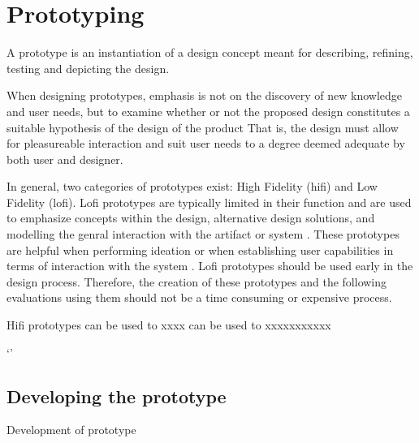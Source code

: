 \section{Prototyping} %
A prototype is an instantiation of a design concept meant for describing, refining, testing and depicting the design. \cite{BUXTON2007139_prototyping}

When designing prototypes, emphasis is not on the discovery of new knowledge and user needs, but to examine whether or not the proposed design constitutes a suitable hypothesis of the design of the product \cite{nielsen-norman-prototype-low-vs-high,BUXTON2007139_prototyping}
That is, the design must allow for pleasureable interaction and suit user needs to a degree deemed adequate by both user and designer.

In general, two categories of prototypes exist: High Fidelity (hifi) and Low Fidelity (lofi).
Lofi prototypes are typically limited in their function and are used to emphasize concepts within the design, alternative design solutions, and modelling the genral interaction with the artifact or system \cite{low-vs-high-fidelity-prototype}.
These prototypes are helpful when performing ideation %
or when establishing user capabilities in terms of interaction with the system \cite{usefullness-of-different-prototypes,low-vs-high-fidelity-prototype}. 
Lofi prototypes should be used early in the design process. 
Therefore, the creation of these prototypes and the following evaluations  using them should not be a time consuming or expensive process. \cite{usefullness-of-different-prototypes,low-vs-high-fidelity-prototype}  


Hifi prototypes can be used to xxxx
can be used to xxxxxxxxxxx

`'


\subsection{Developing the prototype}
Development of prototype